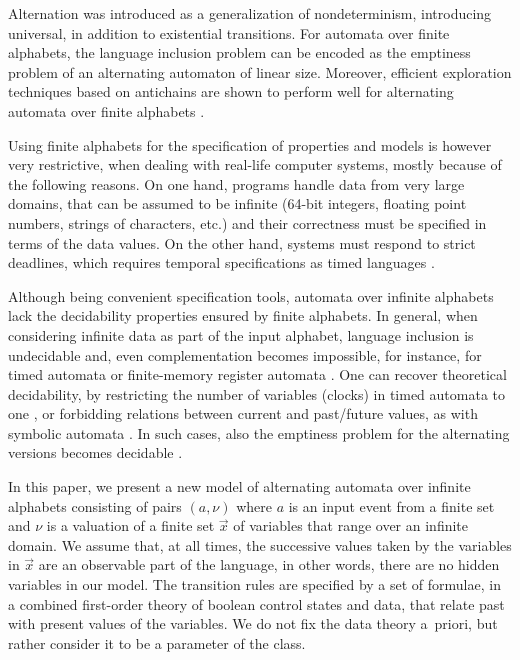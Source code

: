 \documentclass[10pt]{llncs}
\begin{document}
Alternation \cite{ChandraKozenStockmeyer81} was introduced as a
generalization of nondeterminism, introducing universal, in addition
to existential transitions. For automata over finite alphabets, the
language inclusion problem can be encoded as the emptiness problem of
an alternating automaton of linear size. Moreover, efficient
exploration techniques based on antichains are shown to perform well
for alternating automata over finite alphabets \cite{DeWulf08}.

Using finite alphabets for the specification of properties and models
is however very restrictive, when dealing with real-life computer
systems, mostly because of the following reasons. On one hand,
programs handle data from very large domains, that can be assumed to
be infinite (64-bit integers, floating point numbers, strings of
characters, etc.) and their correctness must be specified in terms of
the data values. On the other hand, systems must respond to strict
deadlines, which requires temporal specifications as timed
languages \cite{AlurDill94}.

Although being convenient specification tools, automata over infinite
alphabets lack the decidability properties ensured by finite
alphabets. In general, when considering infinite data as part of the
input alphabet, language inclusion is undecidable and, even
complementation becomes impossible, for instance, for timed automata
\cite{AlurDill94} or finite-memory register automata
\cite{Kaminski94}. One can recover theoretical decidability, by
restricting the number of variables (clocks) in timed automata to one
\cite{OuaknineWorrell04}, or forbidding relations between current and
past/future values, as with symbolic automata
\cite{symbTransd:POPL12}. In such cases, also the emptiness problem
for the alternating versions becomes decidable
\cite{Lasota05,DAntoniKW16}.

In this paper, we present a new model of alternating automata over
infinite alphabets consisting of pairs $(a,\nu)$ where $a$ is an input
event from a finite set and $\nu$ is a valuation of a finite set
$\vec{x}$ of variables that range over an infinite domain. We assume
that, at all times, the successive values taken by the variables in
$\vec{x}$ are an observable part of the language, in other words,
there are no hidden variables in our model. The transition rules are
specified by a set of formulae, in a combined first-order theory of
boolean control states and data, that relate past with present values
of the variables. We do not fix the data theory a~priori, but rather
consider it to be a parameter of the class.
\end{document}
